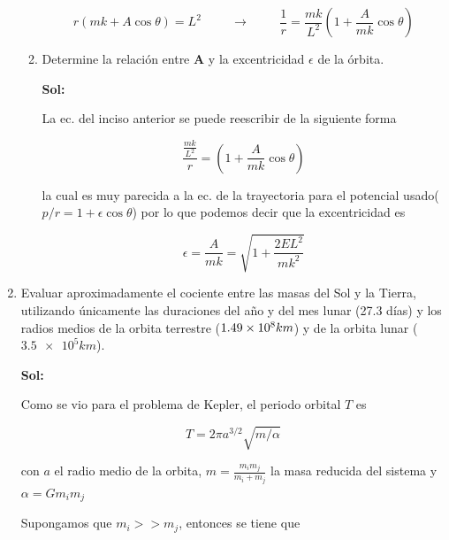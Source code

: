 \documentclass[12pt,a4paper]{article}
\begin{document}
\begin{enumerate}
\begin{enumerate}
    \begin{equation*}
        r (mk + A\cos{\theta}) = L^2 \hspace{1cm} \rightarrow \hspace{1cm} \frac{1}{r} = \frac{mk}{L^2} \left(1 + \frac{A}{mk} \cos{\theta}\right)
    \end{equation*}
    
    \item Determine la relación entre $\mathbf{A}$ y la excentricidad $\epsilon$ de la órbita.
    
    \textbf{Sol:}
    
    La ec. del inciso anterior se puede reescribir de la siguiente forma 
    
    \begin{equation*}
        \frac{\frac{mk}{L^2}}{r} = \left(1 + \frac{A}{mk}\cos{\theta}\right)
    \end{equation*}
    
    la cual es muy parecida a la ec. de la trayectoria para el potencial usado($p/r = 1 +\epsilon \cos{ \theta}$) por lo que podemos decir  que la excentricidad es
    
    \begin{equation*}
        \epsilon = \frac{A}{mk} = \sqrt{1 + \frac{2EL^2}{mk^2}}
    \end{equation*}
    
\end{enumerate}






\item Evaluar aproximadamente el cociente entre las masas del Sol y la Tierra, utilizando únicamente las duraciones del año y del mes lunar (27.3 días) y los radios medios de la orbita terrestre ($\num{1.49 e 8}km$) y de la orbita lunar ($\num{3.5e5} km$).

\textbf{Sol:}

Como se vio para el problema de Kepler, el periodo orbital $T$ es
    
    \begin{equation*}
        T= 2\pi a^{3/2} \sqrt{m/ \alpha}
    \end{equation*}
    
    con  $a$ el radio medio de la orbita, $m= \frac{m_i m_j}{m_i + m_j}$ la masa reducida del sistema y $\alpha=G m_i m_j$ 
    
    Supongamos que $m_i >> m_j$, entonces se tiene que
    

\end{enumerate}
\end{document}
